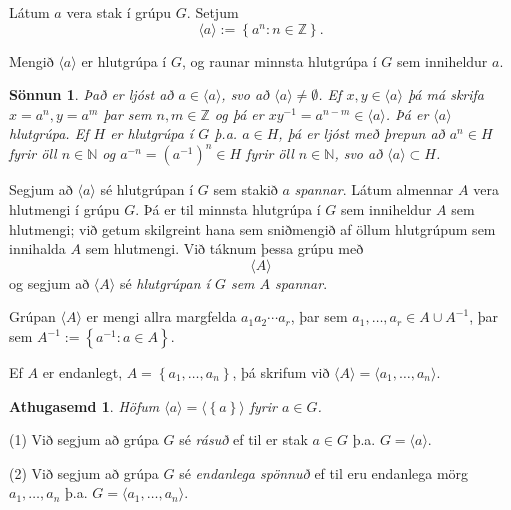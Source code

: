 \documentclass[a4paper,icelandic,11pt]{book}
\theoremstyle{plain}
\newtheorem*{ath}{Athugasemd}
\newtheorem*{sonnun}{Sönnun}
\newcommand{\N}{\mathbb{N}}
\newcommand{\Z}{\mathbb{Z}}
\begin{document}
\begin{skilgr}
  Látum $a$ vera stak í grúpu $G$. Setjum \[
  \langle a \rangle := \left\{ a^n : n\in \Z \right\}.
  \]
\end{skilgr}
\begin{setn}
  Mengið $\langle a \rangle$ er hlutgrúpa í $G$, og raunar minnsta hlutgrúpa í
  $G$ sem inniheldur $a$.
\end{setn}
\begin{sonnun}
  Það er ljóst að $a\in \langle a \rangle$, svo að $\langle a\rangle \neq
  \emptyset$. Ef $x,y\in \langle a\rangle$ þá má skrifa $x = a^n, y=a^m$ þar sem
  $n,m\in \Z$ og þá er $xy^{-1} = a^{n-m}\in \langle a \rangle$. Þá er
  $\langle a \rangle$ hlutgrúpa. Ef $H$ er hlutgrúpa í $G$ þ.a. $a\in H$, þá er
  ljóst með þrepun að $a^n\in H$ fyrir öll $n\in\N$ og $a^{-n}=\left(
  a^{-1}
  \right)^{n}\in H$ fyrir öll $n\in\N$, svo að $\langle a \rangle \subset H$.
\end{sonnun}
\begin{skilgr}
  Segjum að $\langle a \rangle$ sé hlutgrúpan í $G$ sem stakið
  $a$ \emph{spannar}.
  Látum almennar $A$ vera hlutmengi í grúpu $G$. Þá er til minnsta hlutgrúpa í
  $G$ sem inniheldur $A$ sem hlutmengi; við getum skilgreint hana sem sniðmengið
  af öllum hlutgrúpum sem innihalda $A$ sem hlutmengi. Við táknum þessa grúpu
  með\[
  \langle A\rangle
  \]
  og segjum að $\langle A\rangle$ sé \emph{hlutgrúpan í $G$ sem $A$
  spannar}.
\end{skilgr}
\begin{setn}
  Grúpan $\langle A \rangle$ er mengi allra margfelda $a_1 a_2 \cdots a_r$, þar
  sem $a_1,\dots,a_r \in A\cup A^{-1}$, þar sem $A^{-1} := \left\{ a^{-1}:a\in A
  \right\}$.
\end{setn}
\begin{skilgr}
  Ef $A$ er endanlegt, $A=\left\{ a_1,\dots,a_n \right\}$, þá skrifum við
  $\langle A \rangle = \langle a_1,\dots,a_n \rangle. $
\end{skilgr}
\begin{ath}
  Höfum $\langle a \rangle = \langle \left\{ a \right\} \rangle$ fyrir
  $a\in G$.
\end{ath}
\begin{skilgr}
  (1) Við segjum að grúpa $G$ sé \emph{rásuð} ef til er stak $a\in G$ þ.a.
  $G= \langle a \rangle$.

  (2) Við segjum að grúpa $G$ sé \emph{endanlega spönnuð} ef til eru endanlega
  mörg $a_1,\dots,a_n$ þ.a. $G=\langle a_1,\dots,a_n \rangle$.
\end{skilgr}
\end{document}
